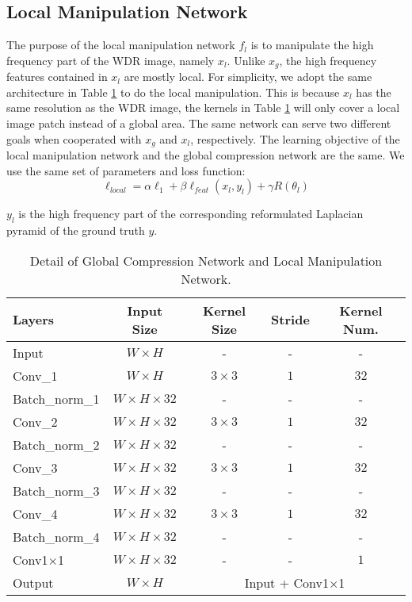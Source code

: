\documentclass[journal]{IEEEtran}
\begin{document}
\subsection{Local Manipulation Network}
The purpose of the local manipulation network $f_l$ is to manipulate the high frequency part of the WDR image, namely $x_l$. Unlike $x_g$, the high frequency features contained in $x_l$ are mostly local. For simplicity, we adopt the same architecture in Table \ref{table:globalnetwork} to do the local manipulation. This is because $x_l$ has the same resolution as the WDR image, the kernels in Table \ref{table:globalnetwork} will only cover a local image patch instead of a global area. The same network can serve two different goals when cooperated with $x_g$ and $x_l$, respectively. 
The learning objective of the local manipulation network and the global compression network are the same. We use the same set of parameters and loss function:
\begin{equation}
    \ell_{local} = \alpha \ell_1 +\beta \ell_{feat}(x_l, y_l) + \gamma R(\theta_l)
\end{equation}

$y_l$ is the high frequency part of the corresponding reformulated Laplacian pyramid of the ground truth $y$. 


\begin{table}
\footnotesize
\begin{center}
\caption{Detail of Global Compression Network and Local Manipulation Network.}
\begin{tabular}{l|c|c|c|c}
\hline
 Layers & Input Size & Kernel Size & Stride & Kernel Num.\\
\hline
 Input  & $ W \times H$ & - & - & - \\
 Conv\_1 & $ W \times H$ & $3 \times 3$ & $1$ & $32$ \\
 Batch\_norm\_1 & $W \times H \times 32$ & - & - & - \\
 Conv\_2 & $ W \times H \times 32$ & $3 \times 3$ & $1$ & $32$ \\
 Batch\_norm\_2 & $W \times H \times 32$ & - & - & - \\
 Conv\_3 & $ W \times H \times 32$ & $3 \times 3$ & $1$ & $32$ \\
 Batch\_norm\_3 & $W \times H \times 32$ & - & - & - \\
 Conv\_4 & $ W \times H \times 32$ & $3 \times 3$ & $1$ & $32$ \\
 Batch\_norm\_4 & $W \times H \times 32$ & - & - & - \\
 Conv1$\times$1 & $ W \times H \times 32$ & - & - & $1$ \\
 \hline
 Output & $W \times H$ &\multicolumn{3}{c}{Input + Conv1$\times$1}\\
\hline
\end{tabular}
\label{table:globalnetwork}
\end{center}
\end{table}
\end{document}
